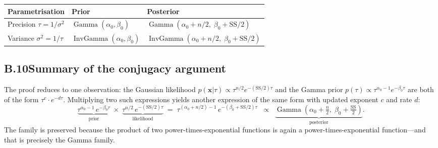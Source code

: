 \documentclass[11pt, a4paper]{article}
\newcommand{\IG}{\operatorname{InvGamma}}
\newcommand{\Ga}{\operatorname{Gamma}}
\theoremstyle{definition}
\begin{document}
\medskip
\begin{center}
\begin{tabular}{lll}
\toprule
Parametrisation & Prior & Posterior \\
\midrule
Precision $\tau=1/\sigma^2$ & $\Ga(\alpha_0,\beta_0)$ & $\Ga(\alpha_0+n/2,\;\beta_0+\mathrm{SS}/2)$ \\
Variance $\sigma^2=1/\tau$  & $\IG(\alpha_0,\beta_0)$ & $\IG(\alpha_0+n/2,\;\beta_0+\mathrm{SS}/2)$ \\
\bottomrule
\end{tabular}
\end{center}

\subsection*{B.10\quad Summary of the conjugacy argument}

The proof reduces to one observation: the Gaussian likelihood
$p(\mathbf{x}|\tau)\propto\tau^{n/2}e^{-(\mathrm{SS}/2)\tau}$ and
the Gamma prior $p(\tau)\propto\tau^{\alpha_0-1}e^{-\beta_0\tau}$
are both of the form $\tau^{c}\cdot e^{-d\tau}$.  Multiplying two such
expressions yields another expression of the same form with
updated exponent $c$ and rate $d$:
\[
  \underbrace{\tau^{\alpha_0-1}\,e^{-\beta_0\tau}}_{\text{prior}}
  \;\times\;
  \underbrace{\tau^{n/2}\,e^{-(\mathrm{SS}/2)\tau}}_{\text{likelihood}}
  \;=\;
  \tau^{(\alpha_0+n/2)-1}\,e^{-(\beta_0+\mathrm{SS}/2)\tau}
  \;\;\propto\;\;
  \underbrace{\Ga\!\left(\alpha_0+\tfrac{n}{2},\;\beta_0+\tfrac{\mathrm{SS}}{2}\right)}_{\text{posterior}}.
\]
The family is preserved because the product of two power-times-exponential
functions is again a power-times-exponential function---and that is
precisely the Gamma family.
\end{document}
